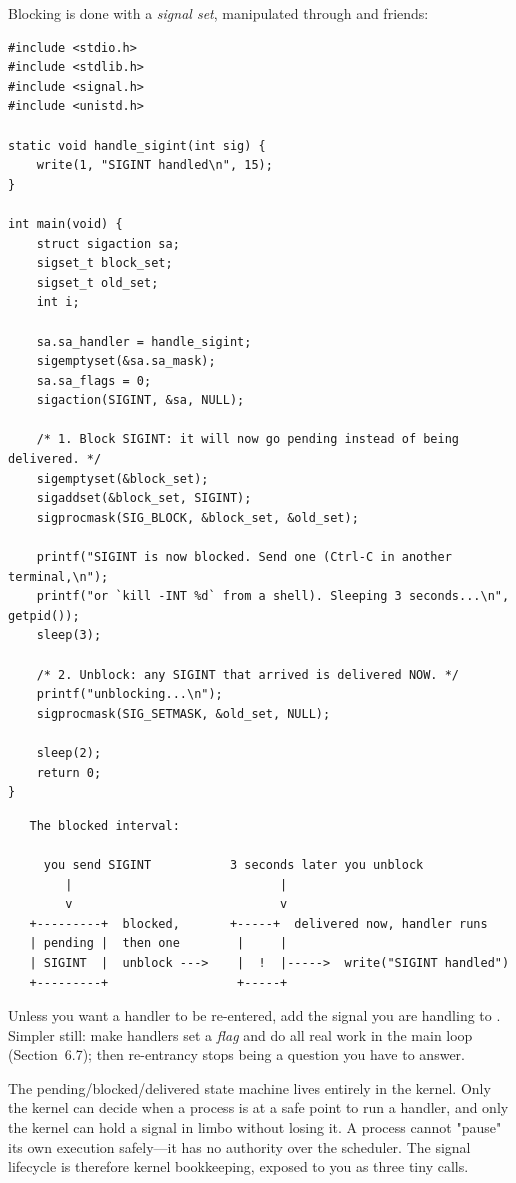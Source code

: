 Blocking is done with a \emph{signal set}, manipulated through
 and friends:

\begin{lstlisting}[caption={Block, then unblock, a signal.}]
#include <stdio.h>
#include <stdlib.h>
#include <signal.h>
#include <unistd.h>

static void handle_sigint(int sig) {
    write(1, "SIGINT handled\n", 15);
}

int main(void) {
    struct sigaction sa;
    sigset_t block_set;
    sigset_t old_set;
    int i;

    sa.sa_handler = handle_sigint;
    sigemptyset(&sa.sa_mask);
    sa.sa_flags = 0;
    sigaction(SIGINT, &sa, NULL);

    /* 1. Block SIGINT: it will now go pending instead of being delivered. */
    sigemptyset(&block_set);
    sigaddset(&block_set, SIGINT);
    sigprocmask(SIG_BLOCK, &block_set, &old_set);

    printf("SIGINT is now blocked. Send one (Ctrl-C in another terminal,\n");
    printf("or `kill -INT %d` from a shell). Sleeping 3 seconds...\n", getpid());
    sleep(3);

    /* 2. Unblock: any SIGINT that arrived is delivered NOW. */
    printf("unblocking...\n");
    sigprocmask(SIG_SETMASK, &old_set, NULL);

    sleep(2);
    return 0;
}
\end{lstlisting}

\begin{verbatim}
   The blocked interval:

     you send SIGINT           3 seconds later you unblock
        |                             |
        v                             v
   +---------+  blocked,       +-----+  delivered now, handler runs
   | pending |  then one        |     |
   | SIGINT  |  unblock --->    |  !  |----->  write("SIGINT handled")
   +---------+                  +-----+
\end{verbatim}

\begin{ruleofthumb}
Unless you want a handler to be re-entered, add the signal you are
handling to . Simpler still: make handlers set a
\emph{flag} and do all real work in the main loop (Section~6.7); then
re-entrancy stops being a question you have to answer.
\end{ruleofthumb}

\begin{osconcept}
The pending/blocked/delivered state machine lives entirely in the
kernel. Only the kernel can decide when a process is at a safe point to
run a handler, and only the kernel can hold a signal in limbo without
losing it. A process cannot "pause" its own execution safely---it has
no authority over the scheduler. The signal lifecycle is therefore
kernel bookkeeping, exposed to you as three tiny calls.
\end{osconcept}

